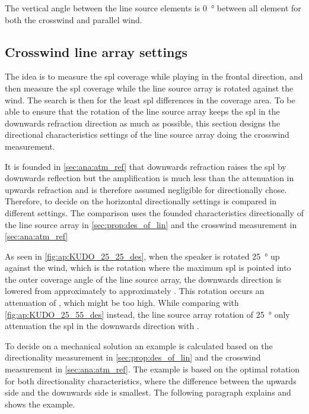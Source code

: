 
The vertical angle between the line source elements is \SI{0}{\degree} between all element for both the crosswind and parallel wind.  

\subsection{Crosswind line array settings} \label{sub:des:cros_set}
The idea is to measure the \gls{spl} coverage while playing in the frontal direction, and then measure the \gls{spl} coverage while the line source array is rotated against the wind. The search is then for the least \gls{spl} differences in the coverage area. To be able to ensure that the rotation of the line source array keeps the \gls{spl} in the downwards refraction direction as much as possible, this section designs the directional characteristics settings of the line source array doing the crosswind measurement.

It is founded in \autoref{sec:ana:atm_ref} that downwards refraction raises the \gls{spl} by downwards reflection but the amplification is much less than the attenuation in upwards refraction and is therefore assumed negligible for directionally chose. Therefore, to decide on the horizontal directionally settings is compared in different settings. The comparison uses the founded characteristics directionally of the line source array in \autoref{sec:prop:des_of_lin} and the crosswind measurement in \autoref{sec:ana:atm_ref}

As seen in \autoref{fig:ap:KUDO_25_25_des}, when the speaker is rotated \SI{25}{\degree} up against the wind, which is the rotation where the maximum \gls{spl} is pointed into the outer  coverage angle of the line source array, the downwards direction is lowered from approximately  to approximately . This rotation occurs an attenuation of , which might be too high. While comparing with \autoref{fig:ap:KUDO_25_55_des} instead, the line source array rotation of \SI{25}{\degree} only attenuation the \gls{spl} in the downwards direction with . 

To decide on a mechanical solution an example is calculated based on the directionality measurement in \autoref{sec:prop:des_of_lin} and the crosswind measurement in \autoref{sec:ana:atm_ref}. The example is based on the optimal rotation for both directionality characteristics, where the difference between the upwards side and the downwards side is smallest. The following paragraph explains and shows the example.


